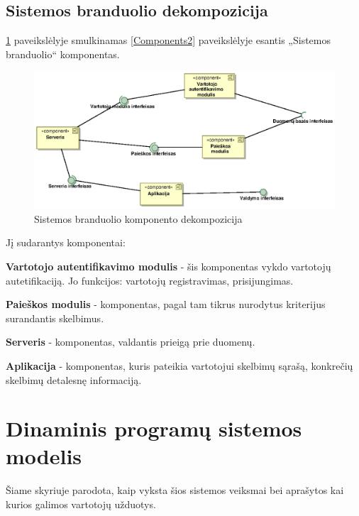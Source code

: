 \documentclass[12pt]{article}
\begin{document}
	\subsection{Sistemos branduolio dekompozicija}
	\ref{Components3} paveikslėlyje smulkinamas \ref{Components2} paveikslėlyje esantis „Sistemos branduolio“ komponentas.
	\begin{figure}[h]
		\begin{center}
			\includegraphics[width=\textwidth]{Komponentai3.eps}
			\caption{Sistemos branduolio komponento dekompozicija\label{Components3}}
		\end{center}
	\end{figure}

	 \bigbreak Jį sudarantys komponentai:\bigbreak
	
	\textbf{Vartotojo autentifikavimo modulis} - šis komponentas vykdo vartotojų autetifikaciją. Jo funkcijos: vartotojų registravimas, prisijungimas.
	
	\textbf{Paieškos modulis} - komponentas, pagal tam tikrus nurodytus kriterijus surandantis skelbimus.
	
	\textbf{Serveris} - komponentas, valdantis prieigą prie duomenų.
	
	\textbf{Aplikacija} - komponentas, kuris pateikia vartotojui skelbimų sąrašą, konkrečių skelbimų detalesnę informaciją.
	\pagebreak

	\section{Dinaminis programų sistemos modelis}
	Šiame skyriuje parodota, kaip vyksta šios sistemos veiksmai bei aprašytos kai kurios galimos vartotojų užduotys. 
	
\end{document}
